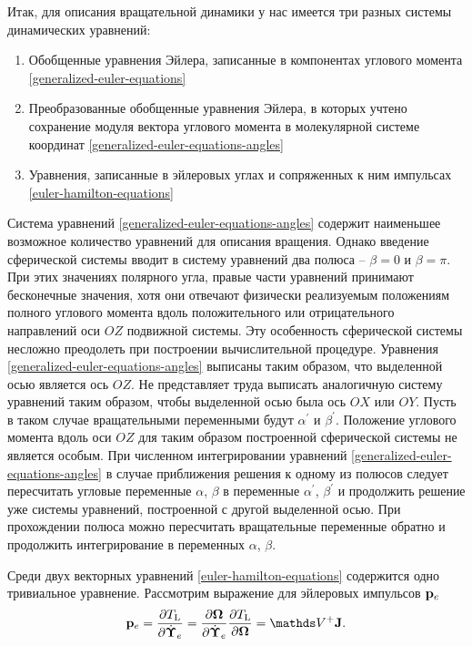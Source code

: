 Итак, для описания вращательной динамики у нас имеется три разных системы динамических уравнений:
\begin{enumerate}
    \item Обобщенные уравнения Эйлера, записанные в компонентах углового момента \eqref{generalized-euler-equations}
    \item Преобразованные обобщенные уравнения Эйлера, в которых учтено сохранение модуля вектора углового момента в молекулярной системе координат \eqref{generalized-euler-equations-angles}
    \item Уравнения, записанные в эйлеровых углах и сопряженных к ним импульсах \eqref{euler-hamilton-equations}
\end{enumerate}

Система уравнений \eqref{generalized-euler-equations-angles} содержит наименьшее возможное количество уравнений для описания вращения. Однако введение сферической системы вводит в систему уравнений два полюса -- $\beta = 0$ и $\beta = \pi$. При этих значениях полярного угла, правые части уравнений принимают бесконечные значения, хотя они отвечают физически реализуемым положениям полного углового момента вдоль положительного или отрицательного направлений оси $OZ$ подвижной системы. Эту особенность сферической системы несложно преодолеть при построении вычислительной процедуре. Уравнения \eqref{generalized-euler-equations-angles} выписаны таким образом, что выделенной осью является ось $OZ$. Не представляет труда выписать аналогичную систему уравнений таким образом, чтобы выделенной осью была ось $OX$ или $OY$. Пусть в таком случае вращательными переменными будут $\alpha^\prime$ и $\beta^\prime$. Положение углового момента вдоль оси $OZ$ для таким образом построенной сферической системы не является особым. При численном интегрировании уравнений \eqref{generalized-euler-equations-angles} в случае приближения решения к одному из полюсов следует пересчитать угловые переменные $\alpha$, $\beta$ в переменные $\alpha^\prime$, $\beta^\prime$ и продолжить решение уже системы уравнений, построенной с другой выделенной осью. При прохождении полюса можно пересчитать вращательные переменные обратно и продолжить интегрирование в переменных $\alpha$, $\beta$. \par
Среди двух векторных уравнений \eqref{euler-hamilton-equations} содержится одно тривиальное уравнение. Рассмотрим выражение для эйлеровых импульсов $\mathbf{p}_e$
\begin{gather}
    \pe = \frac{\partial \Tl}{\partial \dot{\boldsymbol{\Upsilon}}_e} = \frac{\partial \bOmega}{\partial \dot{\boldsymbol{\Upsilon}}_e} \frac{\partial \Tl}{\partial \bOmega} = \bbV^+ \mf{J}.
\end{gather}

